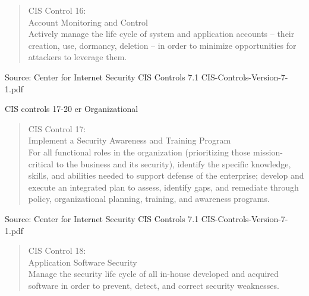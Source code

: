 \documentclass[Screen16to9,17pt]{foils}
\begin{document}
\begin{quote}
CIS Control 16:\\
Account Monitoring and Control\\
Actively manage the life cycle of system and application accounts – their creation, use, dormancy, deletion – in order to minimize opportunities for attackers to leverage them.
\end{quote}

\begin{list1}
\item
\item
\item
\item
\end{list1}

Source: Center for Internet Security CIS Controls 7.1 CIS-Controls-Version-7-1.pdf


CIS controls 17-20 er Organizational

\begin{quote}
CIS Control 17:\\
Implement a Security Awareness and Training Program\\
For all functional roles in the organization (prioritizing those mission-critical to the business and its security), identify the specific knowledge, skills, and abilities needed to support defense of the enterprise; develop and execute an integrated plan to assess, identify gaps, and remediate through policy, organizational planning, training, and awareness programs.
\end{quote}

\begin{list1}
\item
\item
\end{list1}

Source: Center for Internet Security CIS Controls 7.1 CIS-Controls-Version-7-1.pdf


\begin{quote}
CIS Control 18:\\
Application Software Security\\
Manage the security life cycle of all in-house developed and acquired software in order to prevent, detect, and correct security weaknesses.
\end{quote}
\end{document}
